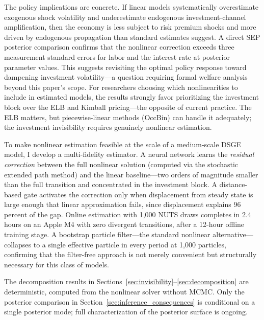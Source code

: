 \documentclass[12pt]{article}
\theoremstyle{plain}
\theoremstyle{definition}
\theoremstyle{remark}
\begin{document}
The policy implications are concrete. If linear models systematically overestimate exogenous shock volatility and underestimate endogenous investment-channel amplification, then the economy is less subject to risk premium shocks and more driven by endogenous propagation than standard estimates suggest. A direct SEP posterior comparison confirms that the nonlinear correction exceeds three measurement standard errors for labor and the interest rate at posterior parameter values. This suggests revisiting the optimal policy response toward dampening investment volatility---a question requiring formal welfare analysis beyond this paper's scope. For researchers choosing which nonlinearities to include in estimated models, the results strongly favor prioritizing the investment block over the ELB and Kimball pricing---the opposite of current practice. The ELB matters, but piecewise-linear methods (OccBin) can handle it adequately; the investment invisibility requires genuinely nonlinear estimation.

To make nonlinear estimation feasible at the scale of a medium-scale DSGE model, I develop a multi-fidelity estimator. A neural network learns the \textit{residual correction} between the full nonlinear solution (computed via the stochastic extended path method) and the linear baseline---two orders of magnitude smaller than the full transition and concentrated in the investment block. A distance-based gate activates the correction only when displacement from steady state is large enough that linear approximation fails, since displacement explains 96 percent of the gap. Online estimation with 1,000 NUTS draws completes in 2.4 hours on an Apple M4 with zero divergent transitions, after a 12-hour offline training stage. A bootstrap particle filter---the standard nonlinear alternative---collapses to a single effective particle in every period at 1,000 particles, confirming that the filter-free approach is not merely convenient but structurally necessary for this class of models.

The decomposition results in Sections~\ref{sec:invisibility}--\ref{sec:decomposition} are deterministic, computed from the nonlinear solver without MCMC. Only the posterior comparison in Section~\ref{sec:inference_consequences} is conditional on a single posterior mode; full characterization of the posterior surface is ongoing.
\end{document}
